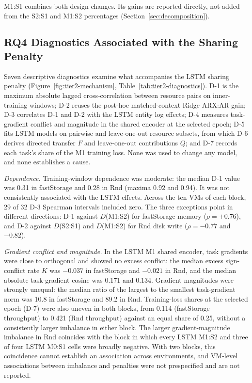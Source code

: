 \documentclass[5p,twocolumn]{elsarticle}
\begin{document}
M1:S1 combines both design changes. Its gains are reported directly, not
added from the S2:S1 and M1:S2 percentages (Section~\ref{sec:decomposition}).

\subsection{RQ4 Diagnostics Associated with the Sharing Penalty}
\label{sec:results-diagnostics}

Seven descriptive diagnostics examine what accompanies the LSTM sharing
penalty (Figure~\ref{fig:tier2-mechanism}, Table~\ref{tab:tier2-diagnostics}).
D-1 is the maximum absolute lagged cross-correlation between resource pairs on
inner-training windows; D-2 reuses the post-hoc matched-context Ridge ARX:AR
gain; D-3 correlates D-1 and D-2 with the LSTM entity log effects; D-4
measures task-gradient conflict and magnitude in the shared encoder at the
selected epoch; D-5 fits LSTM models on pairwise and leave-one-out resource
subsets, from which D-6 derives directed transfer $F$ and leave-one-out
contributions $Q$; and D-7 records each task's share of the M1 training loss.
None was used to change any model, and none establishes a cause.

\emph{Dependence.} Training-window dependence was moderate: the median D-1
value was 0.31 in fastStorage and 0.28 in Rnd (maxima 0.92 and 0.94). It was
not consistently associated with the LSTM effects. Across the ten VMs of
each block, 29 of 32 D-3 Spearman intervals included zero. The three
exceptions point in different directions: D-1 against $D$(M1:S2) for
fastStorage memory ($\rho=+0.76$), and D-2 against $D$(S2:S1) and
$D$(M1:S2) for Rnd disk write ($\rho=-0.77$ and $-0.82$).

\emph{Gradient conflict and magnitude.} In the LSTM M1 shared encoder, task
gradients were close to orthogonal and showed no excess conflict: the median
excess sign-conflict rate $K$ was $-0.037$ in fastStorage and $-0.021$ in Rnd,
and the median absolute task-gradient cosine was 0.171 and 0.134. Gradient
magnitudes were strongly unequal: the median ratio of the largest to the
smallest task-gradient norm was 10.8 in fastStorage and 89.2 in Rnd.
Training-loss shares at the selected epoch (D-7) were also uneven in both
blocks, from 0.114 (fastStorage throughput) to 0.421 (Rnd throughput)
against an equal share of 0.25, without a consistently larger imbalance in
either block. The larger gradient-magnitude imbalance in Rnd coincides with
the block in
which every LSTM M1:S2 and three of four LSTM M0:S1 cells were broadly
negative. With two blocks, this coincidence cannot establish an association
across environments, and VM-level associations between imbalance and
penalties were not prespecified and are not reported.
\end{document}
